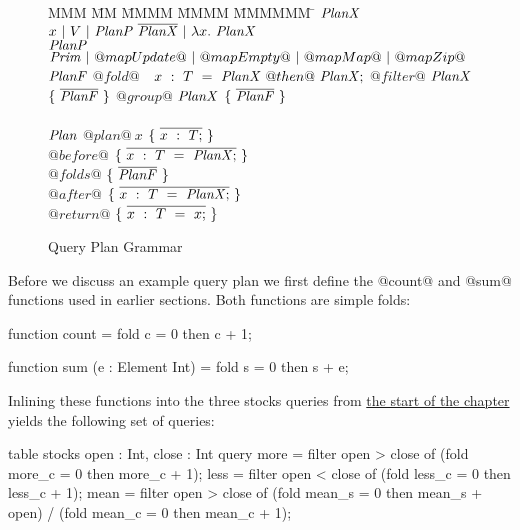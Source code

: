 \begin{figure}

\begin{tabbing}
MMM \= MM \= MMMM \= MMMM \= MMMMMM \= \kill
$\mathit{PlanX}$
\GrammarDefTab
  $x~|~V~|~\mathit{PlanP}~\overline{\mathit{PlanX}}~|~\lambda{}x.~\mathit{PlanX}$
\\
$\mathit{PlanP}$
\GrammarDefTab
  $\mathit{Prim}~|~@mapUpdate@~|~@mapEmpty@~|~@mapMap@~|~@mapZip@$
\\
$\mathit{PlanF}$
\GrammarDefTab
 $@fold@$ \> $~~x~:~T~=~\mathit{PlanX}~@then@~\mathit{PlanX};$
\GrammarAlt
 $@filter@$ \> $\mathit{PlanX}$ \> $\{~\overline{\mathit{PlanF}}~\}$
\GrammarAlt
  $@group@$ \> $\mathit{PlanX}$ \> $\{~\overline{\mathit{PlanF}}~\}$
\\
\\
$\mathit{Plan}$
\GrammarDefTab
  $@plan@~x$ \> $\{~\overline{x~:~T;}~\}$
\\
  \> \> $@before@$ \> $\{~\overline{x~:~T~=~\mathit{PlanX};}~\}$ \\
  \> \> $@folds@$  \> $\{~\overline{\mathit{PlanF}}~\}$ \\
  \> \> $@after@$  \> $\{~\overline{x~:~T~=~\mathit{PlanX};}~\}$ \\
  \> \> $@return@$ \> $\{~\overline{x~:~T~=~x;}~\}$ \\
\end{tabbing}



\caption{Query Plan Grammar}
\label{icicle:fig:core:grammar}
\end{figure}


Before we discuss an example query plan we first define the @count@ and @sum@ functions used in earlier sections.
Both functions are simple folds:
\begin{icicle}
function count
 = fold c = 0 then c + 1;

function sum (e : Element Int)
 = fold s = 0 then s + e;
\end{icicle}

Inlining these functions into the three stocks queries from \hyperref[icicle:s:Introduction]{the start of the chapter} yields the following set of queries:

\begin{icicle}
table stocks { open : Int, close : Int }
query 
  more = filter open > close of (fold more_c = 0 then more_c + 1);
  less = filter open < close of (fold less_c = 0 then less_c + 1);
  mean = filter open > close of
      (fold mean_s = 0 then mean_s + open) / (fold mean_c = 0 then mean_c + 1);
\end{icicle}

